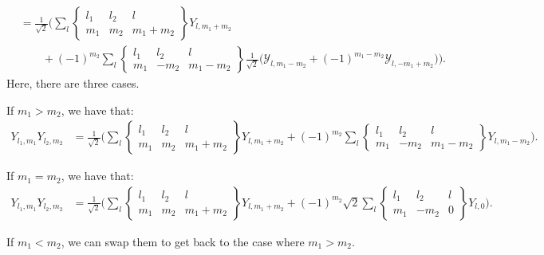 \documentclass[10pt]{article}
\begin{document}
\begin{itemize}
\begin{align*}
			&= \frac{1}{\sqrt{2}} \bigg( 
			\sum_{l} \begin{Bmatrix} l_1 & l_2 & l \\ m_1 & m_2 & m_1 + m_2 \end{Bmatrix} Y_{l,m_1+m_2}  \\
			&\qquad + (-1)^{m_2} \sum_{l} \begin{Bmatrix} l_1 & l_2 & l \\ m_1 & -m_2 & m_1 - m_2 \end{Bmatrix} \frac{1}{\sqrt{2}} \bigg(  \mathcal{Y}_{l, m_1-m_2} + (-1)^{m_1-m_2} \mathcal{Y}_{l, -m_1+m_2} \bigg) \bigg).
		\end{align*}
		Here, there are three cases.  

		If $m_1 > m_2$, we have that:
		\begin{align*}
			Y_{l_1, m_1} Y_{l_2, m_2}
			&= \frac{1}{\sqrt{2}} \bigg( 
			\sum_{l} \begin{Bmatrix} l_1 & l_2 & l \\ m_1 & m_2 & m_1 + m_2 \end{Bmatrix} Y_{l,m_1+m_2} 
			+ (-1)^{m_2} \sum_{l} \begin{Bmatrix} l_1 & l_2 & l \\ m_1 & -m_2 & m_1 - m_2 \end{Bmatrix} Y_{l,m_1-m_2} \bigg).
		\end{align*}

		If $m_1 = m_2$, we have that:
		\begin{align*}
			Y_{l_1, m_1} Y_{l_2, m_2}
			&= \frac{1}{\sqrt{2}} \bigg( 
			\sum_{l} \begin{Bmatrix} l_1 & l_2 & l \\ m_1 & m_2 & m_1 + m_2 \end{Bmatrix} Y_{l,m_1+m_2} 
			+ (-1)^{m_2} \sqrt{2} \sum_{l} \begin{Bmatrix} l_1 & l_2 & l \\ m_1 & -m_2 & 0 \end{Bmatrix} Y_{l,0} \bigg).
		\end{align*}

		If $m_1 < m_2$, we can swap them to get back to the case where $m_1 > m_2$.


\end{itemize}
\end{document}
